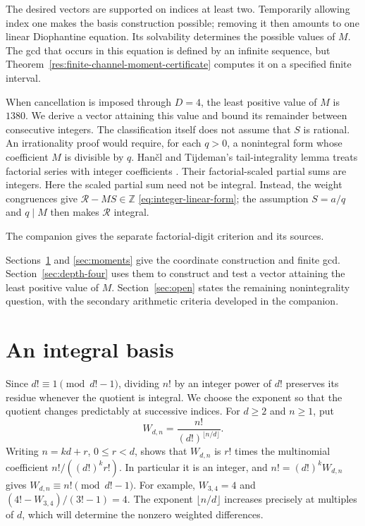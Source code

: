 \documentclass[11pt]{article}
\begin{document}
The desired vectors are supported on indices at least two. Temporarily
allowing index one makes the basis construction possible; removing it
then amounts to one linear Diophantine equation. Its solvability
determines the possible values of $M$. The gcd that occurs in this
equation is defined by an infinite sequence, but
Theorem~\ref{res:finite-channel-moment-certificate} computes it on a
specified finite interval.

When cancellation is imposed through $D=4$, the least positive value
of $M$ is $1380$.
We derive a vector attaining this value and bound its remainder between
consecutive integers. The classification itself does not assume that
$S$ is rational. An irrationality proof would require, for each $q>0$,
a nonintegral form whose coefficient $M$ is divisible by $q$.
Han\v{c}l and Tijdeman's tail-integrality lemma treats factorial series
with integer coefficients \cite[Lemma~2.1 and the following remark,
p.~385]{hancl-tijdeman}. Their factorial-scaled partial sums are integers.
Here the scaled partial sum need not be integral. Instead, the weight
congruences give $\mathcal R-MS\in\mathbb Z$
\eqref{eq:integer-linear-form}; the assumption $S=a/q$ and $q\mid M$
then makes $\mathcal R$ integral.

The companion gives the separate factorial-digit criterion and its sources.


Sections~\ref{sec:channels} and \ref{sec:moments} give the coordinate
construction and finite gcd. Section~\ref{sec:depth-four} uses them to
construct and test a vector attaining the least positive value of $M$. Section~\ref{sec:open}
states the remaining nonintegrality question, with the secondary
arithmetic criteria developed in the companion.

\section{An integral basis}\label{sec:channels}

Since $d!\equiv1\pmod{d!-1}$, dividing $n!$ by an integer power of
$d!$ preserves its residue whenever the quotient is integral. We choose
the exponent so that the quotient changes predictably at successive
indices. For $d\ge2$
and $n\ge1$, put
\[
 W_{d,n}=\frac{n!}{(d!)^{\lfloor n/d\rfloor}}.
\]
Writing $n=kd+r$, $0\le r<d$, shows that $W_{d,n}$ is $r!$ times the
multinomial coefficient $n!/((d!)^k r!)$. In particular it is an integer,
and $n!=(d!)^kW_{d,n}$ gives
$W_{d,n}\equiv n!\pmod{d!-1}$. For example, $W_{3,4}=4$ and
$(4!-W_{3,4})/(3!-1)=4$.
The exponent $\lfloor n/d\rfloor$ increases precisely at multiples
of $d$, which will determine the nonzero weighted differences.
\end{document}
